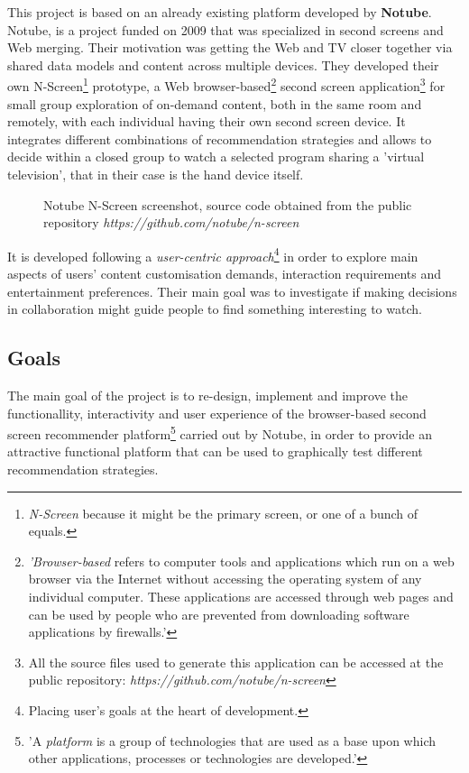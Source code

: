 \documentclass{acm_proc_article-sp}
\begin{document}
This project is based on an already existing platform developed by \textbf{Notube}\cite{aroyo2009notube}. Notube, is a project funded on 2009 that was specialized in second screens and Web merging. Their motivation was getting the Web and TV closer together via shared data models and content across multiple devices. They developed their own N-Screen\footnote{\textit{N-Screen} because it might be the primary screen, or one of a bunch of equals.} prototype, a Web browser-based\cite{business:bb}\footnote{\textit{'Browser-based} refers to computer tools and applications which run on a web browser via the Internet without accessing the operating system of any individual computer. These applications are accessed through web pages and can be used by people who are prevented from downloading software applications by firewalls.'} second screen application\footnote{All the source files used to generate this application can be accessed at the public repository:
\textit{https://github.com/notube/n-screen}} for small group exploration of on-demand content, both in the same room and remotely, with each individual having their own second screen device. It integrates different combinations of recommendation strategies and allows to decide within a closed group to watch a selected program sharing a 'virtual television', that in their case is the hand device itself. 

\begin{figure}[!htb]
	\centering
	\caption{Notube N-Screen screenshot, source code obtained from the public repository \textit{https://github.com/notube/n-screen}}
	\label{fig:oldnotubenscreen}
\end{figure}

It is developed following a \textit{user-centric approach}\footnote{Placing user's goals at the heart of development.} in order to explore main aspects of users' content customisation demands, interaction requirements and entertainment preferences. Their main goal was to investigate if making decisions in collaboration might guide people to find something interesting to watch. 

\subsection{Goals}

The main goal of the project is to re-design, implement and improve the functionallity, interactivity and user experience of the browser-based second screen recommender platform\cite{tech:platform}\footnote{'A \textit{platform} is a group of technologies that are used as a base upon which other applications, processes or technologies are developed.'} carried out by Notube, in order to provide an attractive functional platform that can be used to graphically test different recommendation strategies. 
\end{document}
